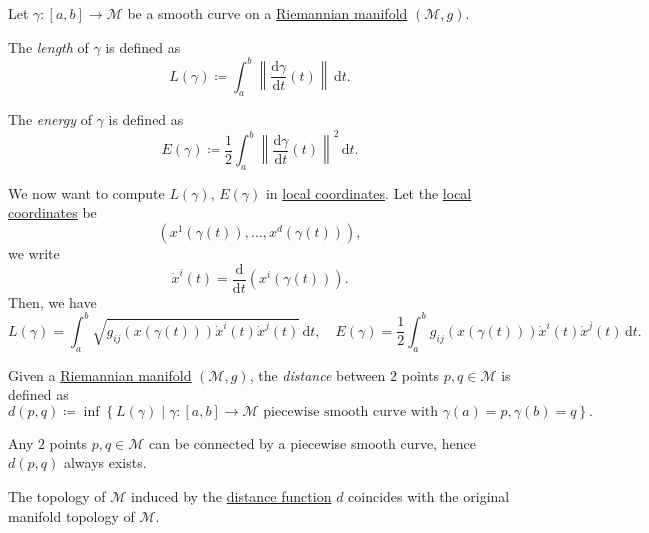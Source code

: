\begin{definition*}
	Let \(\gamma \colon [a, b] \to  \mathcal{M} \) be a smooth curve on a \hyperref[def:Riemannian-manifold]{Riemannian manifold} \((\mathcal{M} , g)\).

	\begin{definition}[Length]\label{def:length}
		The \emph{length} of \(\gamma \) is defined as
		\[
			L(\gamma ) \coloneqq \int_{a}^{b} \left\lVert \frac{\mathrm{d}\gamma }{\mathrm{d}t} (t) \right\rVert  \,\mathrm{d}t .
		\]
	\end{definition}

	\begin{definition}[Energy]\label{def:energy}
		The \emph{energy} of \(\gamma \) is defined as
		\[
			E(\gamma )\coloneqq \frac{1}{2} \int_{a}^{b} \left\lVert \frac{\mathrm{d}\gamma }{\mathrm{d}t} (t) \right\rVert ^2 \,\mathrm{d}t .
		\]
	\end{definition}
\end{definition*}

We now want to compute \(L(\gamma )\), \(E(\gamma )\) in \hyperref[def:coordinate-chart]{local coordinates}. Let the \hyperref[def:coordinate-chart]{local coordinates} be
\[
	(x^1(\gamma (t)), \ldots , x^d(\gamma (t))),
\]
we write
\[
	\dot{x}^i (t) = \frac{\mathrm{d}}{\mathrm{d}t} (x^i (\gamma (t))).
\]
Then, we have
\[
	L(\gamma ) = \int_{a}^{b} \sqrt{g_{ij} (x(\gamma (t))) \dot{x}^i(t)\dot{x}^j(t)}  \,\mathrm{d}t, \quad
	E(\gamma ) = \frac{1}{2} \int_{a}^{b} g_{ij} (x(\gamma (t))) \dot{x}^i(t)\dot{x}^j(t) \,\mathrm{d}t.
\]

\begin{definition}[Distance]\label{def:distance}
	Given a \hyperref[def:Riemannian-manifold]{Riemannian manifold} \((\mathcal{M} , g)\), the \emph{distance} between \(2\) points \(p, q\in \mathcal{M} \) is defined as
	\[
		d(p, q)\coloneqq \inf \left\{ L(\gamma ) \mid \gamma \colon [a, b]\to  \mathcal{M} \text{ piecewise smooth curve with }\gamma (a)=p, \gamma (b)=q \right\} .
	\]
\end{definition}

\begin{note}
	Any \(2\) points \(p, q\in \mathcal{M} \) can be connected by a piecewise smooth curve, hence \(d(p, q)\) always exists.
\end{note}

\begin{corollary}
	The topology of \(\mathcal{M} \) induced by the \hyperref[def:distance]{distance function} \(d\) coincides with the original manifold topology of \(\mathcal{M} \).
\end{corollary}

